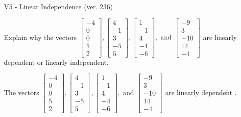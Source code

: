 \begin{exercise}
  \begin{exerciseTitle}V5 - Linear Independence (ver. 236)\end{exerciseTitle}
  \begin{exerciseStatement}
    Explain why the vectors \(\left[\begin{array}{r}
-4 \\
0 \\
0 \\
5 \\
2
\end{array}\right] , \left[\begin{array}{r}
4 \\
-1 \\
3 \\
-5 \\
5
\end{array}\right] , \left[\begin{array}{r}
1 \\
-1 \\
4 \\
-4 \\
-6
\end{array}\right] , \text{ and } \left[\begin{array}{r}
-9 \\
3 \\
-10 \\
14 \\
-4
\end{array}\right]\) are linearly dependent or linearly independent.	


  \end{exerciseStatement}
  \begin{exerciseAnswer}
   The vectors \(\left[\begin{array}{r}
-4 \\
0 \\
0 \\
5 \\
2
\end{array}\right] , \left[\begin{array}{r}
4 \\
-1 \\
3 \\
-5 \\
5
\end{array}\right] , \left[\begin{array}{r}
1 \\
-1 \\
4 \\
-4 \\
-6
\end{array}\right] , \text{ and } \left[\begin{array}{r}
-9 \\
3 \\
-10 \\
14 \\
-4
\end{array}\right]\) are 
  	 linearly dependent  .
  


  \end{exerciseAnswer}
\end{exercise}